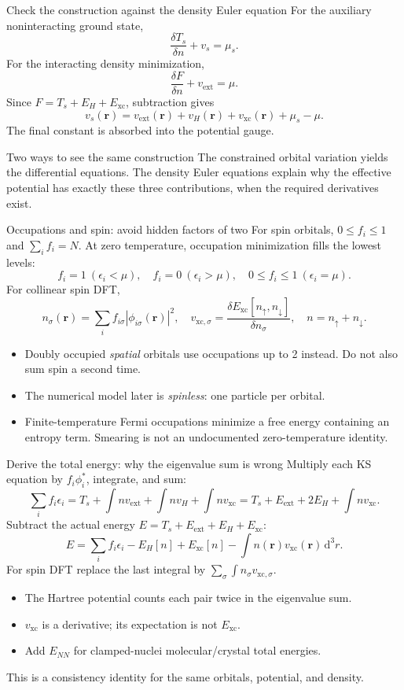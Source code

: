 \documentclass[aspectratio=169,10pt]{beamer}
\newcommand{\dd}{\,\mathrm d}
\newcommand{\rr}{\mathbf r}
\newcommand{\ext}{\mathrm{ext}}
\newcommand{\xc}{\mathrm{xc}}
\begin{document}
\begin{frame}{Check the construction against the density Euler equation}
For the auxiliary noninteracting ground state,
\[
 \frac{\delta T_s}{\delta n}+v_s=\mu_s.
\]
For the interacting density minimization,
\[
 \frac{\delta F}{\delta n}+v_{\ext}=\mu.
\]
Since $F=T_s+E_H+E_{\xc}$, subtraction gives
\[
 v_s(\rr)=v_{\ext}(\rr)+v_H(\rr)+v_{\xc}(\rr)+\mu_s-\mu.
\]
The final constant is absorbed into the potential gauge.
\begin{block}{Two ways to see the same construction}
The constrained orbital variation yields the differential equations.
The density Euler equations explain why the effective potential has exactly
these three contributions, when the required derivatives exist.
\end{block}
\end{frame}

\begin{frame}{Occupations and spin: avoid hidden factors of two}
For spin orbitals, $0\leq f_i\leq1$ and $\sum_i f_i=N$.
At zero temperature, occupation minimization fills the lowest levels:
\[
 f_i=1\ (\epsilon_i<\mu),\quad f_i=0\ (\epsilon_i>\mu),\quad
 0\leq f_i\leq1\ (\epsilon_i=\mu).
\]
For collinear spin DFT,
\[
 n_\sigma(\rr)=\sum_i f_{i\sigma}|\phi_{i\sigma}(\rr)|^2,\quad
 v_{\xc,\sigma}=\frac{\delta E_{\xc}[n_\uparrow,n_\downarrow]}{\delta n_\sigma},
 \quad n=n_\uparrow+n_\downarrow.
\]
\begin{itemize}
\item Doubly occupied \emph{spatial} orbitals use occupations up to 2 instead.
Do not also sum spin a second time.
\item The numerical model later is \emph{spinless}: one particle per orbital.
\item Finite-temperature Fermi occupations minimize a free energy containing
an entropy term. Smearing is not an undocumented zero-temperature identity.
\end{itemize}
\end{frame}

\begin{frame}{Derive the total energy: why the eigenvalue sum is wrong}
Multiply each KS equation by $f_i\phi_i^*$, integrate, and sum:
\[
 \sum_i f_i\epsilon_i=T_s+\int n v_{\ext}+\int n v_H+\int n v_{\xc}
                     =T_s+E_{\ext}+2E_H+\int n v_{\xc}.
\]
Subtract the actual energy $E=T_s+E_{\ext}+E_H+E_{\xc}$:
\[
 \boxed{E=\sum_i f_i\epsilon_i-E_H[n]+E_{\xc}[n]
                                  -\int n(\rr)v_{\xc}(\rr)\dd^3r.}
\]
For spin DFT replace the last integral by $\sum_\sigma\int n_\sigma v_{\xc,\sigma}$.
\begin{itemize}
\item The Hartree potential counts each pair twice in the eigenvalue sum.
\item $v_{\xc}$ is a derivative; its expectation is not $E_{\xc}$.
\item Add $E_{NN}$ for clamped-nuclei molecular/crystal total energies.
\end{itemize}
This is a consistency identity for the same orbitals, potential, and density.
\end{frame}
\end{document}
